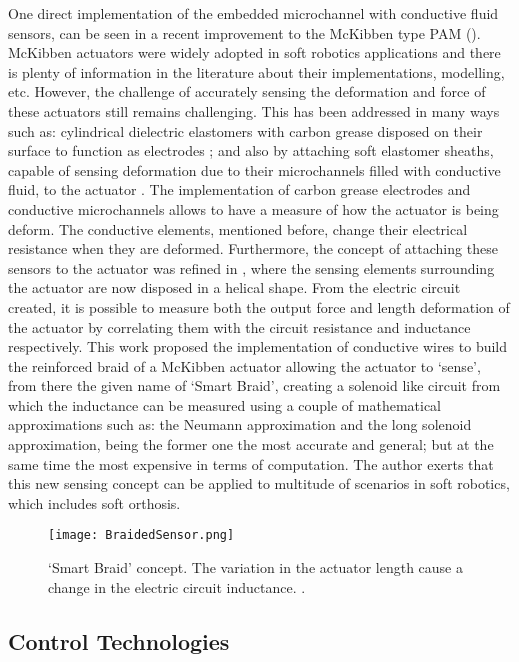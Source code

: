 One direct implementation of the embedded microchannel with conductive fluid sensors, can be seen in a recent improvement to the McKibben type PAM (). McKibben actuators were widely adopted in soft robotics applications and there is plenty of information in the literature about their implementations, modelling, etc. However, the challenge of accurately sensing the deformation and force of these actuators still remains challenging. This has been addressed in many ways such as: cylindrical dielectric elastomers with carbon grease disposed on their surface to function as electrodes \cite{Goulbourne2007}; and also by attaching soft elastomer sheaths, capable of sensing deformation due to their microchannels filled with conductive fluid, to the actuator \cite{Park2013}. The implementation of carbon grease electrodes and conductive microchannels allows to have a measure of how the actuator is being deform. The conductive elements, mentioned before, change their electrical resistance when they are deformed. Furthermore, the concept of attaching these sensors to the actuator was refined in \cite{Felt2014,Felt2015}, where the sensing elements surrounding the actuator are now disposed in a helical shape. From the electric circuit created, it is possible to measure both the output force and length deformation of the actuator by correlating them with the circuit resistance and inductance respectively. This work proposed the implementation of conductive wires to build the reinforced braid of a McKibben actuator allowing the actuator to `sense', from there the given name of `Smart Braid', creating a solenoid like circuit from which the inductance can be measured using a couple of mathematical approximations such as: the Neumann approximation and the long solenoid approximation, being the former one the most accurate and general; but at the same time the most expensive in terms of computation. The author exerts that this new sensing concept can be applied to multitude of scenarios in soft robotics, which includes soft orthosis.
\begin{figure}[hbtp!]
    \centering
    \texttt{[image: BraidedSensor.png]}
    \caption{`Smart Braid' concept. The variation in the actuator length cause a change in the electric circuit inductance. \cite{Felt2015}. }
    \label{fig:braided_sensor}
\end{figure}

\subsection{Control Technologies} \label{sec:controlSystems}

